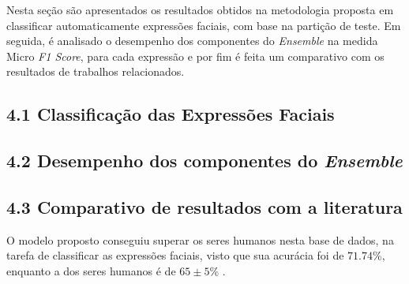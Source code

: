 Nesta seção são apresentados os resultados obtidos na metodologia proposta em classificar automaticamente expressões faciais, com base na partição de teste. Em seguida, é analisado o desempenho dos componentes do \textit{Ensemble} na medida Micro \textit{F1 Score}, para cada expressão e por fim  é feita um comparativo com os resultados de trabalhos relacionados. 

\subsection{4.1 Classificação das Expressões Faciais}


\subsection{4.2 Desempenho dos componentes do \textit{Ensemble}}


\subsection{4.3 Comparativo de resultados com a literatura}


O modelo proposto conseguiu superar os seres humanos nesta base de dados, na tarefa de classificar as expressões faciais, visto que sua acurácia foi de $71.74$\%, enquanto a dos seres humanos é de $65\pm5$\% \cite{goodfellow2013challenges}.
